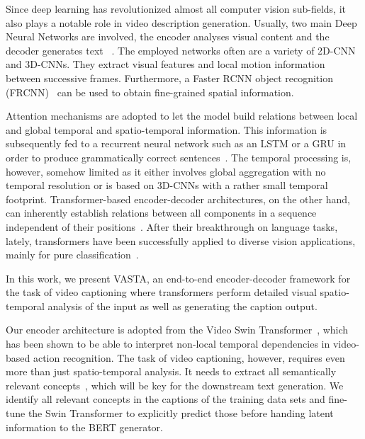 \documentclass[runningheads,table]{llncs}
\newcommand{\modelName}{VASTA\xspace}
\begin{document}
Since deep learning has revolutionized almost all computer vision sub-fields, it also plays a notable role in video description generation. Usually, two main Deep Neural Networks are involved, the encoder analyses
visual content and the decoder generates text
~\cite{donahue2015long,sutskever2014sequence,venugopalan2014translating,yao2015describing,venugopalan2015sequence}.
The employed networks often are a variety of 2D-CNN and 3D-CNNs. They extract visual features and local motion information between successive frames.
Furthermore, a Faster RCNN object recognition (FRCNN)~\cite{ren2015faster} can be used to obtain fine-grained spatial information.

Attention mechanisms are adopted to let the model build relations between local and global temporal and spatio-temporal information. 
This information is subsequently fed to a recurrent neural network such as an LSTM or a GRU in order to produce grammatically correct sentences~\cite{aafaq2019spatio,yan2019stat,zhang2020object,pan2020spatio}.
The temporal processing is, however, somehow limited as it either involves global aggregation with no temporal resolution or is based on 3D-CNNs with a rather small temporal footprint. Transformer-based encoder-decoder architectures, on the other hand, can inherently establish relations between all components in a sequence independent of their positions~\cite{vaswani2017attention}.
After their breakthrough on language tasks, lately, transformers have been successfully applied to diverse vision applications, mainly for pure classification~\cite{arnab2021vivit,liu2021swin}.

In this work, we present \modelName, an end-to-end encoder-decoder framework for the task of video captioning where transformers perform detailed visual spatio-temporal analysis of the input as well as generating the caption output.


Our encoder architecture is adopted from the Video Swin Transformer~\cite{liu2021video}, which has been shown to be able to interpret non-local temporal dependencies in video-based action recognition.
The task of video captioning, however, requires even more than just spatio-temporal analysis. It needs to extract all semantically relevant concepts~\cite{shekhar2020domain,perez2021improving}, which will be key for the downstream text generation. We identify all relevant concepts in the captions of the training data sets and fine-tune the Swin Transformer to explicitly predict those before handing latent information to the BERT generator.
\end{document}
